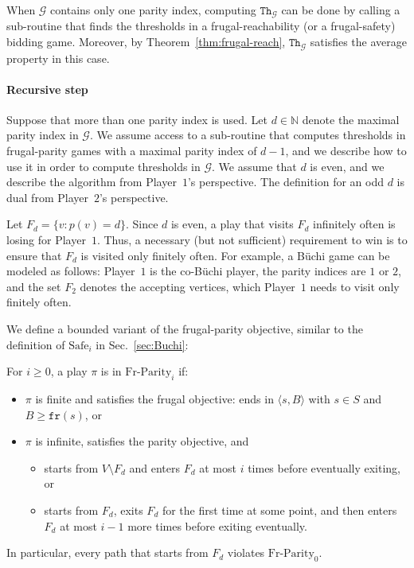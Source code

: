 \documentclass{theoretics}
\newcommand{\PO}{Player~$1$\xspace}
\newcommand{\PT}{Player~$2$\xspace}
\newcommand{\G}{{\mathcal G}}
\newcommand{\fr}{\texttt{fr}}
\newcommand{\Nat}{\mathbb{N}}
\newcommand{\notFd}{V \setminus F_d}
\newcommand{\thresh}{\texttt{Th}\xspace}
\newcommand{\safe}{\text{Safe}}
\newcommand{\frparity}{\text{Fr-Parity}}
\newcommand{\zug}[1]{\langle #1  \rangle}
\renewcommand{\set}[1]{\{ #1  \}}
\begin{document}
\begin{corollary}
When $\G$ contains only one parity index, computing $\thresh_\G$ can be done by calling a sub-routine that finds the thresholds in a frugal-reachability (or a frugal-safety) bidding game. Moreover, by Theorem~\ref{thm:frugal-reach}, $\thresh_\G$ satisfies the average property in this case. 
\end{corollary}

\paragraph*{Recursive step}
Suppose that more than one parity index is used. Let $d \in \Nat$ denote the maximal parity index in $\G$. 
We assume access to a sub-routine that computes thresholds in frugal-parity games with a maximal parity index of $d-1$, and we describe how to use it in order to  compute thresholds in $\G$. We assume that $d$ is even, and we describe the algorithm from \PO's perspective. 
The definition for an odd $d$ is dual from \PT's perspective. 



Let $F_d = \set{v: p(v) = d}$. Since $d$ is even, a play that visits $F_d$ infinitely often is losing for \PO. Thus, a necessary (but not sufficient) requirement to win is to ensure that $F_d$ is visited only finitely often. For example, a B\"uchi game can be modeled as follows: \PO is the co-B\"uchi player, the parity indices are $1$ or $2$, and the set $F_2$ denotes the accepting vertices, which \PO needs to visit only finitely often. 

We define a bounded variant of the frugal-parity objective, similar to the definition of $\safe_i$ in Sec.~\ref{sec:Buchi}:
\begin{definition}
For $i \geq 0$, a play $\pi$ is in $\frparity_i$ if:
\begin{itemize}
\item $\pi$ is finite and satisfies the frugal objective: ends in $\zug{s, B}$ with $s \in S$ and $B \geq \fr(s)$, or
\item $\pi$ is infinite, satisfies the parity objective, and 
\begin{itemize}
\item starts from $\notFd$ and enters $F_d$ at most $i$ times before eventually exiting, or
\item starts from $F_d$, exits $F_d$ for the first time at some point, and then enters $F_d$ at most $i-1$ more times before exiting eventually. 
\end{itemize}
\end{itemize}
\end{definition}
In particular, every path that starts from $F_d$ violates $\frparity_0$. 
\end{document}
